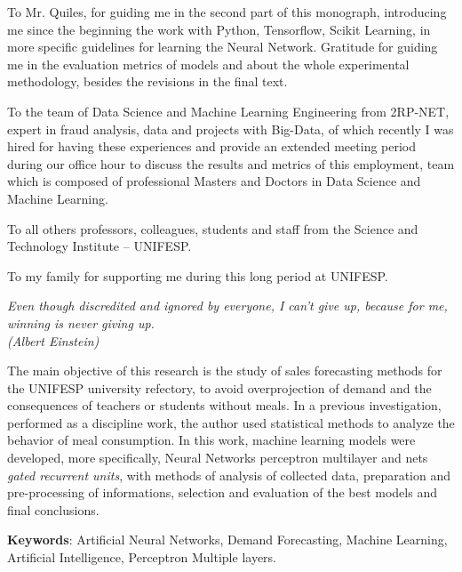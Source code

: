 \begin{agradecimentos}
           To Mr. Quiles, for guiding me in the second part of this monograph, introducing me since the beginning the work with Python, Tensorflow, Scikit Learning, in more specific guidelines for learning the Neural Network. Gratitude for guiding me in the evaluation metrics of models and about the whole experimental methodology, besides the revisions in the final text.
            
            To the team of Data Science and Machine Learning Engineering from 2RP-NET, expert in fraud analysis, data and projects with Big-Data, of which recently I was hired for having these experiences and provide an extended meeting period during our office hour to discuss the results and metrics of this employment, team which is composed of professional Masters and Doctors in Data Science and Machine Learning.
            
            To all others professors, colleagues, students and staff from the Science and Technology Institute – UNIFESP.
                
            
To my family for supporting me during this long period at UNIFESP.

         \end{agradecimentos}
 
 
 
  
    \begin{epigrafe}
        \vspace*{\fill}
    	\begin{flushright}
    		\textit{Even though discredited and ignored by everyone, I can't give up, because for me, winning is never giving up.\\
    		(Albert Einstein)}
    	\end{flushright}
    \end{epigrafe}
 
 
 
    \begin{resumo}
         The main objective of this research is the study of sales forecasting methods for the UNIFESP university refectory, to avoid overprojection of demand and the consequences of teachers or students without meals. In a previous investigation, performed as a discipline work, the author used statistical methods to analyze the behavior of meal consumption. In this work, machine learning models were developed, more specifically, Neural Networks perceptron multilayer and nets \textit{gated recurrent units}, with methods of analysis of collected data, preparation and pre-processing of informations, selection and evaluation of the best models and final conclusions.
     
     \vspace{\onelineskip}
        
     \noindent
     \textbf{Keywords}: Artificial Neural Networks, Demand Forecasting, Machine Learning, Artificial Intelligence, Perceptron Multiple layers.
     
     
    \end{resumo}

